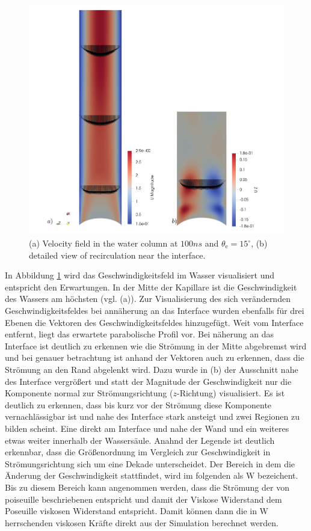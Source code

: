\begin{figure}[h] 
    \centering
    \includegraphics[width=.95\textwidth]{Pictures/Velo_Wedge.pdf}
    \caption{(a) Velocity field in the water column at $100ns$ and $\theta_{\mathrm{e}}=15^{\circ}$, (b) detailed view of recirculation near the interface.}
    \label{fig: Velofield_Wedge}
\end{figure}
In Abbildung \ref{fig: Velofield_Wedge} wird das Geschwindigkeitsfeld im Wasser visualisiert und entspricht den Erwartungen. In der Mitte der Kapillare ist die Geschwindigkeit des Wassers am höchsten (vgl. (a)). Zur Visualisierung des sich verändernden Geschwindigkeitsfeldes bei annäherung an das Interface wurden ebenfalls für drei Ebenen die Vektoren des Geschwindigkeitsfeldes hinzugefügt. Weit vom Interface entfernt, liegt das erwartete parabolische Profil vor. Bei näherung an das Interface ist deutlich zu erkennen wie die Strömung in der Mitte abgebremst wird und bei genauer betrachtung ist anhand der Vektoren auch zu erkennen, dass die Strömung an den Rand abgelenkt wird. Dazu wurde in (b) der Ausschnitt nahe des Interface vergrößert und statt der Magnitude der Geschwindigkeit nur die Komponente normal zur Strömungsrichtung ($z$-Richtung) visualisiert. Es ist deutlich zu erkennen, dass bis kurz vor der Strömung diese Komponente vernachlässigbar ist und nahe des Interface stark ansteigt und zwei Regionen zu bilden scheint. Eine direkt am Interface und nahe der Wand und ein weiteres etwas weiter innerhalb der Wassersäule. Anahnd der Legende ist deutlich erkennbar, dass die Größenordnung im Vergleich zur Geschwindigkeit in Strömungsrichtung sich um eine Dekade unterscheidet. Der Bereich in dem die Änderung der Geschwindigkeit stattfindet, wird im folgenden als $\mathrm{W}$ bezeichent. Bis zu diesem Bereich kann angenommen werden, dass die Strömung der von poiseuille beschriebenen entspricht und damit der Viskose Widerstand dem Poseuille viskosen Widerstand entspricht. Damit können dann die in $\mathrm{W}$ herrschenden viskosen Kräfte direkt aus der Simulation berechnet werden. 



